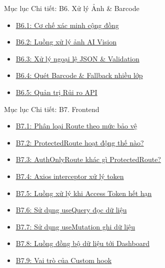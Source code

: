 \documentclass[10pt, aspectratio=169]{beamer}
\begin{document}
\begin{frame}[label=subtoc_b6]{Mục lục Chi tiết: B6. Xử lý Ảnh \& Barcode}
\hypertarget{subtoc_b6_target}{}
    \vspace{0.5cm}
    \begin{itemize}
        \setlength\itemsep{0.5cm}
        \Large
        \item[\textcolor{NutriDark}{$\blacktriangleright$}] \hyperlink{b6_1_target}{B6.1: Cơ chế xác minh cộng đồng}
        \item[\textcolor{NutriDark}{$\blacktriangleright$}] \hyperlink{b6_2_target}{B6.2: Luồng xử lý ảnh AI Vision}
        \item[\textcolor{NutriDark}{$\blacktriangleright$}] \hyperlink{b6_3_target}{B6.3: Xử lý ngoại lệ JSON \& Validation}
        \item[\textcolor{NutriDark}{$\blacktriangleright$}] \hyperlink{b6_4_target}{B6.4: Quét Barcode \& Fallback nhiều lớp}
        \item[\textcolor{NutriDark}{$\blacktriangleright$}] \hyperlink{b6_5_target}{B6.5: Quản trị Rủi ro API}
    \end{itemize}
\end{frame}

\begin{frame}[label=subtoc_b7]{Mục lục Chi tiết: B7. Frontend}
\hypertarget{subtoc_b7_target}{}
    \vspace{0.2cm}
    \begin{itemize}
        \setlength\itemsep{0.35cm}
        \large
        \item[\textcolor{NutriDark}{$\blacktriangleright$}] \hyperlink{b7_1_target}{B7.1: Phân loại Route theo mức bảo vệ}
        \item[\textcolor{NutriDark}{$\blacktriangleright$}] \hyperlink{b7_2_target}{B7.2: ProtectedRoute hoạt động thế nào?}
        \item[\textcolor{NutriDark}{$\blacktriangleright$}] \hyperlink{b7_3_target}{B7.3: AuthOnlyRoute khác gì ProtectedRoute?}
        \item[\textcolor{NutriDark}{$\blacktriangleright$}] \hyperlink{b7_4_target}{B7.4: Axios interceptor xử lý token}
        \item[\textcolor{NutriDark}{$\blacktriangleright$}] \hyperlink{b7_5_target}{B7.5: Luồng xử lý khi Access Token hết hạn}
        \item[\textcolor{NutriDark}{$\blacktriangleright$}] \hyperlink{b7_6_target}{B7.6: Sử dụng useQuery đọc dữ liệu}
        \item[\textcolor{NutriDark}{$\blacktriangleright$}] \hyperlink{b7_7_target}{B7.7: Sử dụng useMutation ghi dữ liệu}
        \item[\textcolor{NutriDark}{$\blacktriangleright$}] \hyperlink{b7_8_target}{B7.8: Luồng đồng bộ dữ liệu tới Dashboard}
        \item[\textcolor{NutriDark}{$\blacktriangleright$}] \hyperlink{b7_9_target}{B7.9: Vai trò của Custom hook}
    \end{itemize}
\end{frame}
\end{document}
